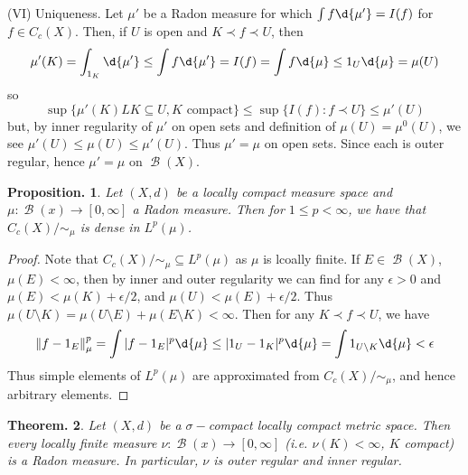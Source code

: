 \documentclass[11pt, a4paper]{memoir}
\newcommand{\norm}[1]{\ensuremath{\left\lVert#1\right\rVert}}
\theoremstyle{change}
\newtheorem{theorem}{Theorem.}[section]
\newtheorem{proposition}[theorem]{Proposition.}
\theoremstyle{plain}
\theoremstyle{nonumberplain}
\newtheorem{proof}{Proof}
\DeclareMathOperator{\B}{{\mathcal{B}}}
\begin{document}
(VI) Uniqueness.
Let $\mu'$ be a Radon measure for which $\int f\d{\mu'}=I(f)$ for $f\in C_c(X)$.
Then, if $U$ is open and $K\prec f\prec U$, then
\begin{equation*}
    \mu'(K)=\int_{1_K}\d{\mu'}\leq\int f\d{\mu'}=I(f)=\int f\d{\mu}\leq 1_U\d{\mu}=\mu(U)
\end{equation*}
so
\begin{equation*}
    \sup\{\mu'(K)LK\subseteq U,K\text{ compact}\}\leq\sup\{I(f):f\prec U\}\leq\mu'(U)
\end{equation*}
but, by inner regularity of $\mu'$ on open sets and definition of $\mu(U)=\mu^0(U)$, we see $\mu'(U)\leq \mu(U)\leq\mu'(U)$.
Thus $\mu'=\mu$ on open sets.
Since each is outer regular, hence $\mu'=\mu$ on $\B(X)$.
\begin{proposition}
    Let $(X,d)$ be a locally compact measure space and $\mu:\B(x)\to[0,\infty]$ a Radon measure.
    Then for $1\leq p<\infty$, we have that $C_c(X)/{\sim_\mu}$ is dense in $L^p(\mu)$.
\end{proposition}
\begin{proof}
    Note that $C_c(X)/{\sim_\mu}\subseteq L^p(\mu)$ as $\mu$ is lcoally finite.
    If $E\in\B(X)$, $\mu(E)<\infty$, then by inner and outer regularity we can find for any $\epsilon>0$ and $\mu(E)<\mu(K)+\epsilon/2$, and $\mu(U)<\mu(E)+\epsilon/2$.
    Thus $\mu(U\setminus K)=\mu(U\setminus E)+\mu(E\setminus K)<\infty$.
    Then for any $K\prec f\prec U$, we have
    \begin{equation*}
        \norm{f-1_E}_\mu^p=\int|f-1_E|^p\d{\mu}\leq|1_U-1_K|^p\d{\mu}=\int1_{U\setminus K}\d{\mu}<\epsilon
    \end{equation*}
    Thus simple elements of $L^p(\mu)$ are approximated from $C_c(X)/{\sim_\mu}$, and hence arbitrary elements.
\end{proof}
\begin{theorem}
    Let $(X,d)$ be a $\sigma-$compact locally compact metric space.
    Then every locally finite measure $\nu:\B(x)\to[0,\infty]$ (i.e. $\nu(K)<\infty$, $K$ compact) is a Radon measure.
    In particular, $\nu$ is outer regular and inner regular.
\end{theorem}
\end{document}
